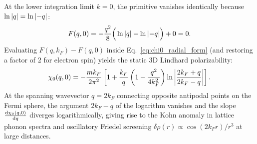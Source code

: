 \documentclass[11pt, a4paper]{article}
\numberwithin{equation}{section}
\begin{document}
At the lower integration limit $k = 0$, the primitive vanishes identically because $\ln\abs{q} = \ln\abs{-q}$:
\begin{equation}
  F(q, 0) = -\frac{q^2}{8} \Big( \ln\abs{q} - \ln\abs{-q} \Big) + 0 = 0.
\end{equation}
Evaluating $F(q, k_F) - F(q, 0)$ inside Eq.~\eqref{eq:chi0_radial_form} (and restoring a factor of $2$ for electron spin) yields the static 3D Lindhard polarizability:
\begin{equation}
  \chi_0(q, 0)
  = -\frac{m k_F}{2\pi^2} \left[
    1 + \frac{k_F}{q} \left( 1 - \frac{q^2}{4k_F^2} \right) \ln\abs{\frac{2k_F + q}{2k_F - q}}
  \right].
\end{equation}
At the spanning wavevector $q = 2k_F$ connecting opposite antipodal points on the Fermi sphere, the argument $2k_F - q$ of the logarithm vanishes and the slope $\dv{\chi_0(q,0)}{q}$ diverges logarithmically, giving rise to the Kohn anomaly in lattice phonon spectra and oscillatory Friedel screening $\delta\rho(r) \propto \cos(2k_F r)/r^3$ at large distances.
\end{document}
